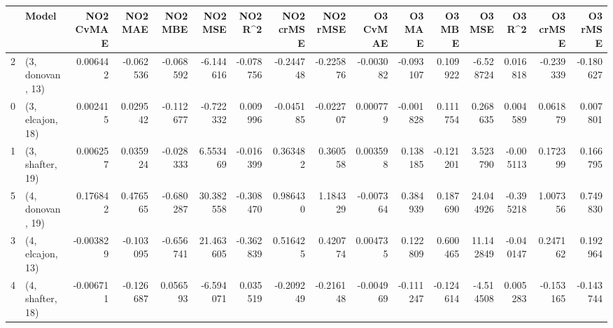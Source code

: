 \begin{tabular}{llrrrrrrrrrrrrrr}
\toprule
{} &             Model &  NO2 CvMAE &   NO2 MAE &   NO2 MBE &    NO2 MSE &   NO2 R\textasciicircum2 &  NO2 crMSE &  NO2 rMSE &  O3 CvMAE &    O3 MAE &    O3 MBE &     O3 MSE &    O3 R\textasciicircum2 &  O3 crMSE &   O3 rMSE \\
\midrule
2 &  (3, donovan, 13) &   0.006442 & -0.062536 & -0.068592 &  -6.144616 & -0.078756 &  -0.244748 & -0.225876 & -0.003082 & -0.093107 &  0.109922 &  -6.528724 &  0.016818 & -0.239339 & -0.180627 \\
0 &  (3, elcajon, 18) &   0.002415 &  0.029542 & -0.112677 &  -0.722332 &  0.009996 &  -0.045185 & -0.022707 &  0.000779 & -0.001828 &  0.111754 &   0.268635 &  0.004589 &  0.061879 &  0.007801 \\
1 &  (3, shafter, 19) &   0.006257 &  0.035924 & -0.028333 &   6.553469 & -0.016399 &   0.363482 &  0.360558 &  0.003598 &  0.138185 & -0.121201 &   3.523790 & -0.005113 &  0.172399 &  0.166795 \\
5 &  (4, donovan, 19) &   0.176842 &  0.476565 & -0.680287 &  30.382558 & -0.308470 &   0.986430 &  1.184329 & -0.007364 &  0.384939 &  0.187690 &  24.044926 & -0.395218 &  1.007356 &  0.749830 \\
3 &  (4, elcajon, 13) &  -0.003829 & -0.103095 & -0.656741 &  21.463605 & -0.362839 &   0.516425 &  0.420774 &  0.004735 &  0.122809 &  0.600465 &  11.142849 & -0.040147 &  0.247162 &  0.192964 \\
4 &  (4, shafter, 18) &  -0.006711 & -0.126687 &  0.056593 &  -6.594071 &  0.035519 &  -0.209249 & -0.216148 & -0.004969 & -0.111247 & -0.124614 &  -4.514508 &  0.005283 & -0.153165 & -0.143744 \\
\bottomrule
\end{tabular}

